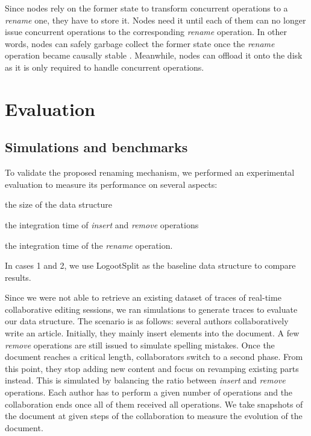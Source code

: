 \documentclass[sigplan,10pt]{acmart}
\begin{document}
Since nodes rely on the former state to transform concurrent operations to a \emph{rename} one, they have to store it.
Nodes need it until each of them can no longer issue concurrent operations to the corresponding \emph{rename} operation.
In other words, nodes can safely garbage collect the former state once the \emph{rename} operation became causally stable \cite{10.1007/978-3-662-43352-2_11}.
Meanwhile, nodes can offload it onto the disk as it is only required to handle concurrent operations.


\section{Evaluation}
\label{sec:evaluation}

\subsection{Simulations and benchmarks}

To validate the proposed renaming mechanism, we performed an experimental evaluation to measure its performance on several aspects:
\begin{enumerate*}
    \item the size of the data structure
    \item the integration time of \emph{insert} and \emph{remove} operations
    \item the integration time of the \emph{rename} operation.
\end{enumerate*}
In cases 1 and 2, we use LogootSplit as the baseline data structure to compare results.

Since we were not able to retrieve an existing dataset of traces of real-time collaborative editing sessions, we ran simulations to generate traces to evaluate our data structure.
The scenario is as follows: several authors collaboratively write an article.
Initially, they mainly insert elements into the document.
A few \emph{remove} operations are still issued to simulate spelling mistakes.
Once the document reaches a critical length, collaborators switch to a second phase.
From this point, they stop adding new content and focus on revamping existing parts instead.
This is simulated by balancing the ratio between \emph{insert} and \emph{remove} operations.
Each author has to perform a given number of operations and the collaboration ends once all of them received all operations.
We take snapshots of the document at given steps of the collaboration to measure the evolution of the document.
\end{document}
